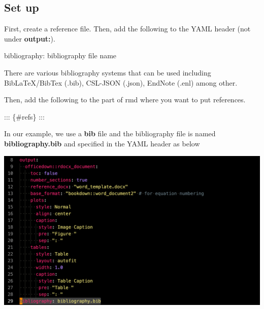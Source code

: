 \documentclass[
  letterpaper,
  DIV=11,
  numbers=noendperiod]{scrreprt}
\newenvironment{Shaded}{\begin{snugshade}}{\end{snugshade}}
\newcommand{\NormalTok}[1]{\textcolor[rgb]{0.00,0.23,0.31}{#1}}
\newcommand{\SpecialCharTok}[1]{\textcolor[rgb]{0.37,0.37,0.37}{#1}}
\begin{document}
\hypertarget{set-up}{%
\subsection{Set up}\label{set-up}}

First, create a reference file. Then, add the following to the YAML
header (not under \textbf{output:}).

\begin{Shaded}
\begin{Highlighting}[]
\NormalTok{bibliography}\SpecialCharTok{:}\NormalTok{ bibliography file name}
\end{Highlighting}
\end{Shaded}

There are various bibliography systems that can be used including
BibLaTeX/BibTex (.bib), CSL-JSON (.json), EndNote (.enl) among other.

Then, add the following to the part of rmd where you want to put
references.

\begin{Shaded}
\begin{Highlighting}[]
\NormalTok{::: \{\#refs\}}
\NormalTok{:::}
\end{Highlighting}
\end{Shaded}

In our example, we use a \textbf{bib} file and the bibliography file is
named \textbf{bibliography.bib} and specified in the YAML header as
below

\includegraphics[width=1\textwidth,height=\textheight]{assets/pictures/yaml-bib.png}
\end{document}
